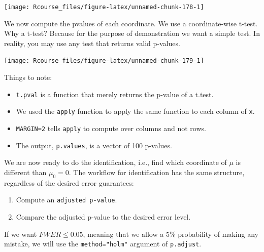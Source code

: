 \documentclass[]{book}
\newenvironment{Shaded}{\begin{snugshade}}{\end{snugshade}}
\newcommand{\KeywordTok}[1]{\textcolor[rgb]{0.13,0.29,0.53}{\textbf{#1}}}
\newcommand{\DataTypeTok}[1]{\textcolor[rgb]{0.13,0.29,0.53}{#1}}
\newcommand{\DecValTok}[1]{\textcolor[rgb]{0.00,0.00,0.81}{#1}}
\newcommand{\StringTok}[1]{\textcolor[rgb]{0.31,0.60,0.02}{#1}}
\newcommand{\ControlFlowTok}[1]{\textcolor[rgb]{0.13,0.29,0.53}{\textbf{#1}}}
\newcommand{\OperatorTok}[1]{\textcolor[rgb]{0.81,0.36,0.00}{\textbf{#1}}}
\newcommand{\NormalTok}[1]{#1}
\providecommand{\tightlist}{%
  \setlength{\itemsep}{0pt}\setlength{\parskip}{0pt}}
\theoremstyle{definition}
\theoremstyle{definition}
\theoremstyle{definition}
\theoremstyle{remark}
\begin{document}
\texttt{[image: Rcourse\_files/figure-latex/unnamed-chunk-178-1]}

We now compute the pvalues of each coordinate. We use a coordinate-wise
t-test. Why a t-test? Because for the purpose of demonstration we want a
simple test. In reality, you may use any test that returns valid
p-values.

\begin{Shaded}
\end{Shaded}

\texttt{[image: Rcourse\_files/figure-latex/unnamed-chunk-179-1]}

Things to note:

\begin{itemize}
\tightlist
\item
  \texttt{t.pval} is a function that merely returns the p-value of a
  t.test.
\item
  We used the \texttt{apply} function to apply the same function to each
  column of \texttt{x}.
\item
  \texttt{MARGIN=2} tells \texttt{apply} to compute over columns and not
  rows.
\item
  The output, \texttt{p.values}, is a vector of 100 p-values.
\end{itemize}

We are now ready to do the identification, i.e., find which coordinate
of \(\mu\) is different than \(\mu_0=0\). The workflow for
identification has the same structure, regardless of the desired error
guarantees:

\begin{enumerate}
\def\labelenumi{\arabic{enumi}.}
\tightlist
\item
  Compute an \texttt{adjusted\ p-value}.
\item
  Compare the adjusted p-value to the desired error level.
\end{enumerate}

If we want \(FWER \leq 0.05\), meaning that we allow a \(5\%\)
probability of making any mistake, we will use the
\texttt{method="holm"} argument of \texttt{p.adjust}.
\end{document}
